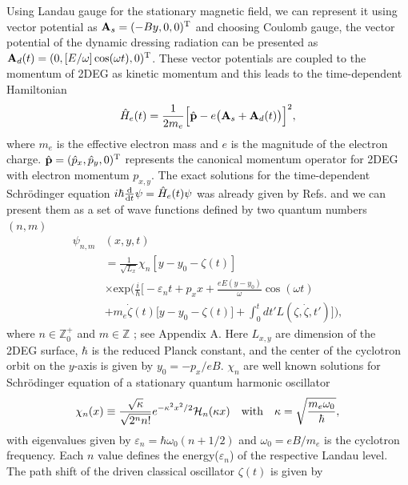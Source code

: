 Using Landau gauge for the stationary magnetic field, we can represent it using vector potential as $\vb{A}_{s} = (-By,0,0)^{\text{T}}$ and choosing Coulomb gauge, the vector potential of the dynamic dressing radiation can be presented as $\vb{A}_{d}(t) = (0,[E/\omega ]\cos(\omega t),0)^{\text{T}}$. These vector potentials are coupled to the momentum of 2DEG as kinetic momentum \cite{mahan00,bruus04} and this leads to the time-dependent Hamiltonian
\begin{equation} \label{eq_1}
  \hat{H}_e(t) = \frac{1}{2m_e}\Big[\hat{\vb{p}} - e\big(\vb{A}_{s}+\vb{A}_{d}(t)\big)\Big]^2,
\end{equation}
where $m_e$ is the effective electron mass and $e$ is the magnitude of the electron charge. $\hat{\vb{p}} = (\hat{p}_x,\hat{p}_y,0)^{\text{T}}$ represents the canonical momentum operator for 2DEG with electron momentum $p_{x,y}$.
The exact solutions for the time-dependent Schrödinger equation $i\hbar \dv{t}\psi = \hat{H}_e(t) \psi$ was already given by Refs. \cite{husmi53,ditt98,dini16} and we can present them as a set of wave functions defined by two quantum numbers $(n,m)$
\begin{equation} \label{eq_2}
  \begin{aligned}
    \psi_{n,m}&(x,y,t)  \\
    & = \frac{1}{\sqrt{L_x}}
    \chi_n\left[y - y_0 - \zeta(t)\right]\\
    & \times
    \text{exp}\bigg(
    \frac{i}{\hbar}\bigg[- \varepsilon_nt
    + p_x x + \frac{eE(y - y_0)}{\omega}\cos(\omega t)\\
    &+
    m_e\dot{\zeta}(t)\big[y - y_0 -\zeta(t)\big] +
    \int_0^{t}dt'L(\zeta,\dot{\zeta},t')\bigg]\bigg),
  \end{aligned}
\end{equation}
where $n \in \mathbb{Z}^{+}_0$ and $m \in \mathbb{Z}$ ; see Appendix A. Here $L_{x,y}$ are dimension of the 2DEG surface, $\hbar$ is the reduced Planck constant, and the center of the cyclotron orbit on the $y$-axis is given by $y_0 = -p_x/eB$. $\chi_n$ are well known solutions for Schrödinger equation of a stationary quantum harmonic oscillator
\begin{equation} \label{eq_3}
  \chi_n(x) \equiv
   \frac{\sqrt{\kappa}}{\sqrt{2^{n}n!}}
  e^{-\kappa^2 x^2/2}
  \mathcal{H}_n \qty(\kappa x) \quad \text{with}
  \quad
  \kappa = \sqrt{\frac{m_e \omega_0}{\hbar}},
\end{equation}
with eigenvalues given by $\varepsilon_n = \hbar \omega_0 (n + 1/2)$ and $\omega_0 = eB/m_e$ is the cyclotron frequency. Each $n$ value defines the  energy($\varepsilon_n$) of the respective Landau level. The path shift of the driven classical oscillator $\zeta(t)$ is given by
